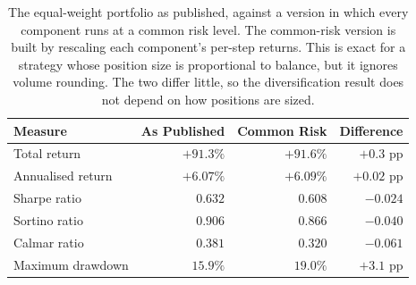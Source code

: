 \begin{table}[htb!]
\centering
\footnotesize
\caption{The equal-weight portfolio as published, against a version in which every component runs at a common risk level. The common-risk version is built by rescaling each component's per-step returns. This is exact for a strategy whose position size is proportional to balance, but it ignores volume rounding. The two differ little, so the diversification result does not depend on how positions are sized.}
\label{Tables:CommonRisk}
\begin{tabular}{@{}lrrr@{}}
\toprule
\textbf{Measure} & \textbf{As Published} & \textbf{Common Risk} & \textbf{Difference} \\
\midrule
Total return & $+91.3\%$ & $+91.6\%$ & $+0.3$ pp \\
Annualised return & $+6.07\%$ & $+6.09\%$ & $+0.02$ pp \\
Sharpe ratio & $0.632$ & $0.608$ & $-0.024$ \\
Sortino ratio & $0.906$ & $0.866$ & $-0.040$ \\
Calmar ratio & $0.381$ & $0.320$ & $-0.061$ \\
Maximum drawdown & $15.9\%$ & $19.0\%$ & $+3.1$ pp \\
\bottomrule
\end{tabular}
\end{table}